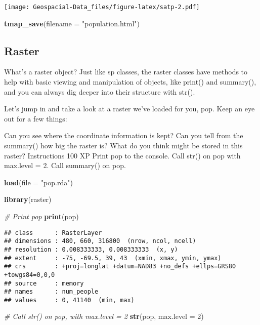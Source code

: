 \documentclass[]{article}
\newenvironment{Shaded}{\begin{snugshade}}{\end{snugshade}}
\newcommand{\CommentTok}[1]{\textcolor[rgb]{0.56,0.35,0.01}{\textit{#1}}}
\newcommand{\DataTypeTok}[1]{\textcolor[rgb]{0.13,0.29,0.53}{#1}}
\newcommand{\DecValTok}[1]{\textcolor[rgb]{0.00,0.00,0.81}{#1}}
\newcommand{\KeywordTok}[1]{\textcolor[rgb]{0.13,0.29,0.53}{\textbf{#1}}}
\newcommand{\NormalTok}[1]{#1}
\newcommand{\StringTok}[1]{\textcolor[rgb]{0.31,0.60,0.02}{#1}}
\begin{document}
\texttt{[image: Geospacial-Data\_files/figure-latex/satp-2.pdf]}

\begin{Shaded}
\begin{Highlighting}[]
\KeywordTok{tmap_save}\NormalTok{(}\DataTypeTok{filename =} \StringTok{"population.html"}\NormalTok{)}
\end{Highlighting}
\end{Shaded}

\hypertarget{raster}{%
\subsection{Raster}\label{raster}}

What's a raster object? Just like sp classes, the raster classes have
methods to help with basic viewing and manipulation of objects, like
print() and summary(), and you can always dig deeper into their
structure with str().

Let's jump in and take a look at a raster we've loaded for you, pop.
Keep an eye out for a few things:

Can you see where the coordinate information is kept? Can you tell from
the summary() how big the raster is? What do you think might be stored
in this raster? Instructions 100 XP Print pop to the console. Call str()
on pop with max.level = 2. Call summary() on pop.

\begin{Shaded}
\begin{Highlighting}[]
\KeywordTok{load}\NormalTok{(}\DataTypeTok{file =} \StringTok{"pop.rda"}\NormalTok{)}

\KeywordTok{library}\NormalTok{(raster)}

\CommentTok{# Print pop}
\KeywordTok{print}\NormalTok{(pop)}
\end{Highlighting}
\end{Shaded}

\begin{verbatim}
## class      : RasterLayer 
## dimensions : 480, 660, 316800  (nrow, ncol, ncell)
## resolution : 0.008333333, 0.008333333  (x, y)
## extent     : -75, -69.5, 39, 43  (xmin, xmax, ymin, ymax)
## crs        : +proj=longlat +datum=NAD83 +no_defs +ellps=GRS80 +towgs84=0,0,0 
## source     : memory
## names      : num_people 
## values     : 0, 41140  (min, max)
\end{verbatim}

\begin{Shaded}
\begin{Highlighting}[]
\CommentTok{# Call str() on pop, with max.level = 2}
\KeywordTok{str}\NormalTok{(pop, }\DataTypeTok{max.level =} \DecValTok{2}\NormalTok{)}
\end{Highlighting}
\end{Shaded}
\end{document}
